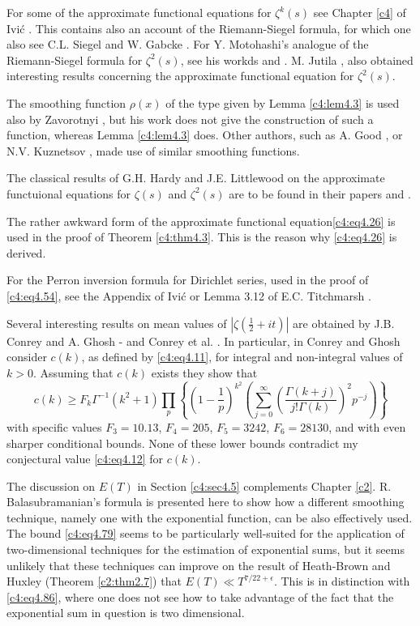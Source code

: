 For some of the approximate functional equations for $\zeta^k (s)$ see\break
Chapter \ref{c4} of Ivi\'c \cite{Ivic1}. This contains also an account of the
Riemann-Siegel formula, for which one also see C.L. Siegel \cite{Siegel1}
and W. Gabcke \cite{Gabcke1}. For Y. Motohashi's analogue of the
Riemann-Siegel formula for $\zeta^2(s)$, see his workds \cite{Motohashi2} and
\cite{Motohashi4}. M. Jutila \cite{Jutila7}, \cite{Jutila8} also obtained interesting
results concerning the approximate functional equation for $\zeta^2
(s)$.

The smoothing function $\rho(x)$ of the type given by Lemma
\ref{c4:lem4.3} is used also by Zavorotnyi \cite{Zavorotnyi1}, but his work does
not give the construction of such a function, whereas Lemma
\ref{c4:lem4.3} does. Other authors, such as A. Good \cite{Good1},
\cite{Good2} or N.V. Kuznetsov \cite{Kuznetsov3}, made use of similar smoothing
functions.

The classical results of G.H. Hardy and J.E. Littlewood on the
approximate functuional equations for $\zeta(s)$ and $\zeta^2 (s)$ are
to be found in their papers \cite{Hardy and Littlewood1} and \cite{Hardy and Littlewood2}.

The rather awkward form of the approximate functional
equation\pageoriginale \eqref{c4:eq4.26} is used in the proof of
Theorem \ref{c4:thm4.3}. This is the reason why \eqref{c4:eq4.26} is
derived. 

For the Perron inversion formula for Dirichlet series, used in the
proof of \eqref{c4:eq4.54}, see the Appendix of Ivi\'c \cite{Ivic1} or
Lemma 3.12 of E.C. Titchmarsh \cite{Titchmarsh1}.

Several interesting results on mean values of $|\zeta (\frac{1}{2} +
it)|$ are obtained by J.B. Conrey and A. Ghosh \cite{Conrey and Ghosh1} - \cite{Conrey and Ghosh4} and
Conrey et al. \cite{Conrey and Ghosh1}. In particular, in \cite{Conrey and Ghosh4} Conrey and Ghosh
consider $c(k)$, as defined by \eqref{c4:eq4.11}, for integral and
non-integral values of $k >0$. Assuming that $c(k)$ exists they show
that
$$
c(k) \geq F_k \Gamma^{-1} (k^2 +1) \prod_p \left\{\left( 1-
\frac{1}{p}\right)^{k^2} \left(\sum_{j=0}^\infty \left(\frac{\Gamma
  (k+j)}{j! \Gamma (k)} \right)^2 p^{-j} \right) \right\}
$$
with specific values $F_3 = 10.13$, $F_4=205$, $F_5 = 3242$, $F_6=
28130$, and with even sharper conditional bounds. None of these lower
bounds contradict my conjectural value \eqref{c4:eq4.12} for $c(k)$.

The discussion on $E(T)$ in Section \ref{c4:sec4.5} complements
Chapter \ref{c2}. R. Balasubramanian's formula \cite{Balasubramanian1} is presented here to
show how a different smoothing technique, namely one with the
exponential function, can be also effectively used. The bound
\eqref{c4:eq4.79} seems to be particularly well-suited for the
application of two-dimensional techniques for the estimation of
exponential sums, but it seems unlikely that these techniques can
improve on the result of Heath-Brown and Huxley (Theorem
\ref{c2:thm2.7}) that $E(T) \ll T^{7/22+\epsilon}$. This is in
distinction with \eqref{c4:eq4.86}, where one does not see how to take
advantage of the fact that the exponential sum in question is two
dimensional.

